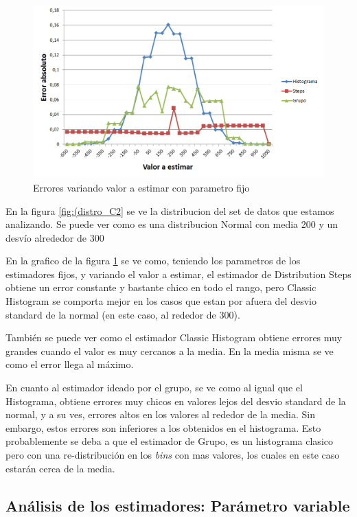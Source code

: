 \documentclass[10pt, a4paper]{article}
\begin{document}
		\newpage					
	\begin{figure}[H]
	  \begin{center}
	    \includegraphics[scale=.40]{imagenes/C2_variando_valor.png}
	    \caption{Errores variando valor a estimar con parametro fijo} 
	    \label{fig:C2_variando_valor}
	  \end{center}
	\end{figure}
		
		En la figura \ref{fig:(distro_C2} se ve la distribucion del set de datos que estamos analizando. Se puede ver como es una distribucion Normal con media 200 y un desv\'io alrededor de 300
		
		En la grafico de la figura \ref{fig:C2_variando_valor} se ve como, teniendo los parametros de los estimadores fijos, y variando el valor a estimar, el estimador de Distribution Steps obtiene un error constante y bastante chico en todo el rango, pero Classic Histogram se comporta mejor en los casos que estan por afuera del desvio standard de la normal (en este caso, al rededor de 300).
		
		Tambi\'en se puede ver como el estimador Classic Histogram obtiene errores muy grandes cuando el valor es muy cercanos a la media. En la media misma se ve como el error llega al m\'aximo.
		
		En cuanto al estimador ideado por el grupo, se ve como al igual que el Histograma, obtiene errores muy chicos en valores lejos del desvio standard de la normal, y a su ves, errores altos en los valores al rededor de la media. Sin embargo, estos errores son inferiores a los obtenidos en el histograma. Esto probablemente se deba a que el estimador de Grupo, es un histograma clasico pero con una re-distribuci\'on en los \textit{bins} con mas valores, los cuales en este caso estarán cerca de la media.
	
\newpage
		
\subsection{An\'alisis de los estimadores: Par\'ametro variable}

	
		
\end{document}
